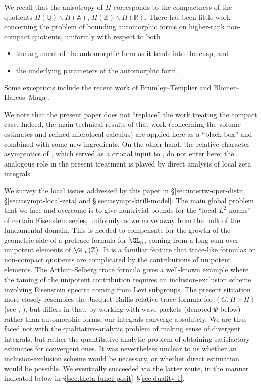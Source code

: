 We recall that the anisotropy of $H$ corresponds to the compactness of the quotients $H(\mathbb{Q}) \backslash H(\mathbb{A})$, $H(\mathbb{Z}) \backslash H(\mathbb{R})$.  There has been little work concerning the problem of bounding automorphic forms on higher-rank non-compact quotients, uniformly with respect to both
\begin{itemize}
\item the argument of the automorphic form as it tends into the cusp, and
\item the underlying parameters of the automorphic form.
\end{itemize}
Some exceptions include the recent work of Brumley--Templier \cite{MR4150475} and Blomer--Harcos--Maga \cite{MR3905609, MR4093914}.

We note that the present paper does not ``replace'' the work \cite{2020arXiv201202187N} treating the compact case.  Indeed, the main technical results of that work (concerning the volume estimates and refined microlocal calculus) are applied here as a ``black box'' and combined with some new ingredients.  On the other hand, the relative character asymptotics of \cite[\S19]{nelson-venkatesh-1}, which served as a crucial input to \cite{2020arXiv201202187N}, do not enter here; the analogous role in the present treatment is played by direct analysis of local zeta integrals.

We survey the local issues addressed by this paper in \S\ref{sec:intertw-oper-distr}, \S\ref{sec:asympt-local-zeta} and \S\ref{sec:asympt-kirill-model}.  The main global problem that we face and overcome is to give nontrivial bounds for the ``local $L^2$-norms'' of certain Eisenstein series, uniformly as we move away from the bulk of the fundamental domain.  This is needed to compensate for the growth of the geometric side of a pretrace formula for $\GL_n$, coming from a long sum over unipotent elements of $\GL_n(\mathbb{Z})$.  It is a familiar feature that trace-like formulas on non-compact quotients are complicated by the contributions of unipotent elements.  The Arthur--Selberg trace formula gives a well-known example where the taming of the unipotent contribution requires an inclusion-exclusion scheme involving Eisenstein spectra coming from Levi subgroups.  The present situation more closely resembles the Jacquet--Rallis relative trace formula for $(G, H \times H)$ (see \cite{MR2767518, MR4195660, MR3947975}, \cite[\S3]{MR4426741}), but differs in that, by working with wave packets (denoted $\Psi$ below) rather than automorphic forms, our integrals converge absolutely.  We are thus faced not with the qualitative-analytic problem of making sense of divergent integrals, but rather the quantitative-analytic problem of obtaining satisfactory estimates for convergent ones.  It was nevertheless unclear to us whether an inclusion-exclusion scheme would be necessary, or whether direct estimation would be possible.  We eventually succeeded via the latter route, in the manner indicated below in \S\ref{sec:theta-funct-posit}--\S\ref{sec:duality-1}.

